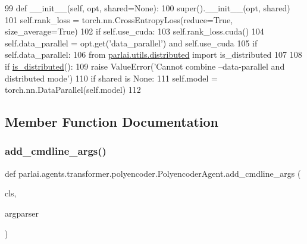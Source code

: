 \begin{DoxyCode}
99     \textcolor{keyword}{def }\_\_init\_\_(self, opt, shared=None):
100         super().\_\_init\_\_(opt, shared)
101         self.rank\_loss = torch.nn.CrossEntropyLoss(reduce=\textcolor{keyword}{True}, size\_average=\textcolor{keyword}{True})
102         \textcolor{keywordflow}{if} self.use\_cuda:
103             self.rank\_loss.cuda()
104         self.data\_parallel = opt.get(\textcolor{stringliteral}{'data\_parallel'}) \textcolor{keywordflow}{and} self.use\_cuda
105         \textcolor{keywordflow}{if} self.data\_parallel:
106             \textcolor{keyword}{from} \hyperlink{namespaceparlai_1_1utils_1_1distributed}{parlai.utils.distributed} \textcolor{keyword}{import} is\_distributed
107 
108             \textcolor{keywordflow}{if} \hyperlink{namespaceparlai_1_1utils_1_1distributed_a023acb5e3b66e1f27e21247c35661279}{is\_distributed}():
109                 \textcolor{keywordflow}{raise} ValueError(\textcolor{stringliteral}{'Cannot combine --data-parallel and distributed mode'})
110             \textcolor{keywordflow}{if} shared \textcolor{keywordflow}{is} \textcolor{keywordtype}{None}:
111                 self.model = torch.nn.DataParallel(self.model)
112 
\end{DoxyCode}


\subsection{Member Function Documentation}
\mbox{\label{classparlai_1_1agents_1_1transformer_1_1polyencoder_1_1PolyencoderAgent_adbbf75b4d5b32529621ab9f6edbb904f}} 
\subsubsection{\texorpdfstring{add\+\_\+cmdline\+\_\+args()}{add\_cmdline\_args()}}
{\footnotesize\ttfamily def parlai.\+agents.\+transformer.\+polyencoder.\+Polyencoder\+Agent.\+add\+\_\+cmdline\+\_\+args (\begin{DoxyParamCaption}\item[{}]{cls,  }\item[{}]{argparser }\end{DoxyParamCaption})}

